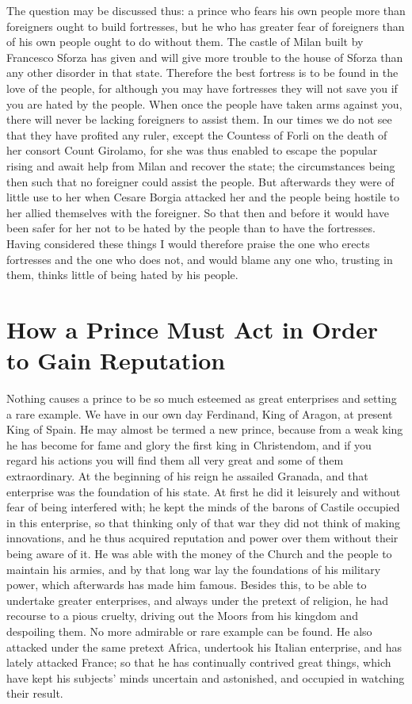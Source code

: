 \documentclass[12pt,letterpaper]{memoir}
\begin{document}
The question may be discussed thus: a prince who fears his own people
more than foreigners ought to build fortresses, but he who has greater
fear of foreigners than of his own people ought to do without them. The
castle of Milan built by Francesco Sforza has given and will give more
trouble to the house of Sforza than any other disorder in that state.
Therefore the best fortress is to be found in the love of the people,
for although you may have fortresses they will not save you if you are
hated by the people. When once the people have taken arms against you,
there will never be lacking foreigners to assist them. In our times
we do not see that they have profited any ruler, except the Countess
of Forli on the death of her consort Count Girolamo, for she was thus
enabled to escape the popular rising and await help from Milan and
recover the state; the circumstances being then such that no foreigner
could assist the people. But afterwards they were of little use to her
when Cesare Borgia attacked her and the people being hostile to her
allied themselves with the foreigner. So that then and before it would
have been safer for her not to be hated by the people than to have the
fortresses. Having considered these things I would therefore praise the
one who erects fortresses and the one who does not, and would blame any
one who, trusting in them, thinks little of being hated by his people.

\chapter{How a Prince Must Act in Order to Gain Reputation}

Nothing causes a prince to be so much esteemed as great enterprises
and setting a rare example. We have in our own day Ferdinand, King of
Aragon, at present King of Spain. He may almost be termed a new prince,
because from a weak king he has become for fame and glory the first
king in Christendom, and if you regard his actions you will find them
all very great and some of them extraordinary. At the beginning of
his reign he assailed Granada, and that enterprise was the foundation
of his state. At first he did it leisurely and without fear of being
interfered with; he kept the minds of the barons of Castile occupied in
this enterprise, so that thinking only of that war they did not think
of making innovations, and he thus acquired reputation and power over
them without their being aware of it. He was able with the money of
the Church and the people to maintain his armies, and by that long war
lay the foundations of his military power, which afterwards has made
him famous. Besides this, to be able to undertake greater enterprises,
and always under the pretext of religion, he had recourse to a pious
cruelty, driving out the Moors from his kingdom and despoiling them.
No more admirable or rare example can be found. He also attacked
under the same pretext Africa, undertook his Italian enterprise, and
has lately attacked France; so that he has continually contrived great
things, which have kept his subjects' minds uncertain and astonished,
and occupied in watching their result.
\end{document}
